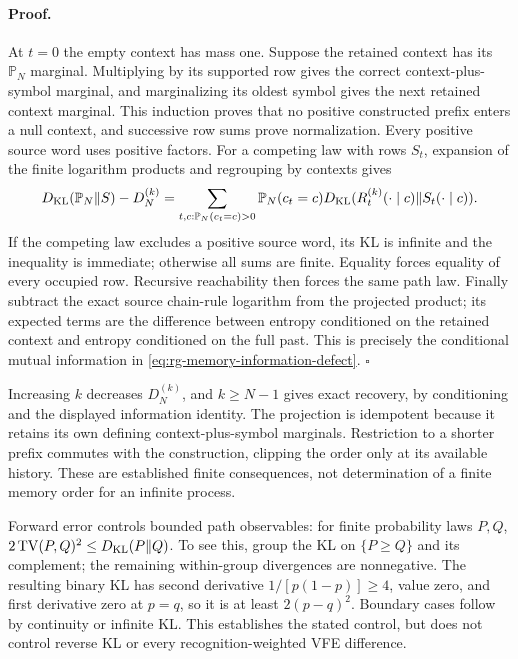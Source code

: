 \paragraph{Proof.}
At \(t=0\) the empty context has mass one. Suppose the retained context
has its \(\mathbb P_N\) marginal. Multiplying by its supported row gives
the correct context-plus-symbol marginal, and marginalizing its oldest
symbol gives the next retained context marginal. This induction proves that
no positive constructed prefix enters a null context, and successive row
sums prove normalization. Every positive source word uses positive factors.
For a competing law with rows \(S_t\), expansion of the finite logarithm
products and regrouping by contexts gives
\begin{equation}
 D_{\mathrm{KL}}(\mathbb P_N\Vert S)-D_N^{(k)}
 =\sum_{t,c:\mathbb P_N(c_t=c)>0}\mathbb P_N(c_t=c)
     D_{\mathrm{KL}}(R_t^{(k)}(\cdot\mid c)\Vert S_t(\cdot\mid c)).
\label{eq:rg-memory-excess-risk}
\end{equation}
If the competing law excludes a positive source word, its KL is infinite
and the inequality is immediate; otherwise all sums are finite. Equality
forces equality of every occupied row. Recursive reachability then forces
the same path law. Finally subtract the exact source chain-rule
logarithm from the projected product; its expected terms are the difference
between entropy conditioned on the retained context and entropy conditioned
on the full past. This is precisely the conditional mutual information in
\cref{eq:rg-memory-information-defect}. \(\square\)

Increasing \(k\) decreases \(D_N^{(k)}\), and \(k\geq N-1\) gives
exact recovery, by conditioning and the displayed information identity.
The projection is idempotent because it retains its own defining
context-plus-symbol marginals. Restriction to a shorter prefix commutes
with the construction, clipping the order only at its available history.
These are established finite consequences, not determination of a finite
memory order for an infinite process. 

Forward error controls bounded path observables: for finite probability laws
\(P,Q\), \(2\operatorname{TV}(P,Q)^2\leq D_{\mathrm{KL}}(P\Vert Q)\).
To see this, group the KL on \(\{P\geq Q\}\) and its complement; the
remaining within-group divergences are nonnegative. The resulting binary
KL has second derivative \(1/[p(1-p)]\geq4\), value zero, and first
derivative zero at \(p=q\), so it is at least \(2(p-q)^2\).
Boundary cases follow by continuity or infinite KL. This establishes the
stated control, but does not control reverse KL or every recognition-weighted
VFE difference. 

